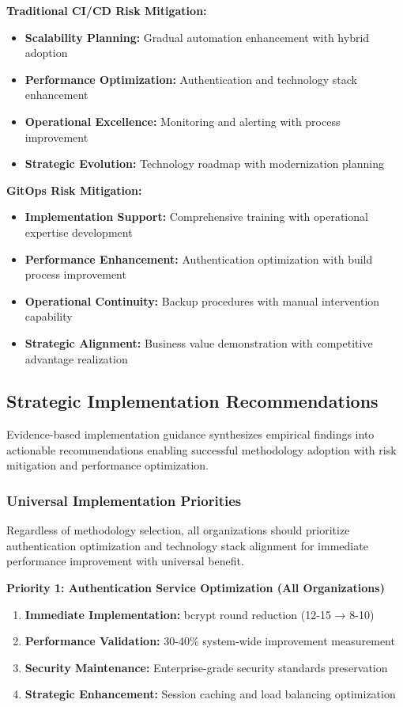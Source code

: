 \textbf{Traditional CI/CD Risk Mitigation:}
\begin{itemize}
\item \textbf{Scalability Planning:} Gradual automation enhancement with hybrid adoption
\item \textbf{Performance Optimization:} Authentication and technology stack enhancement
\item \textbf{Operational Excellence:} Monitoring and alerting with process improvement
\item \textbf{Strategic Evolution:} Technology roadmap with modernization planning
\end{itemize}

\textbf{GitOps Risk Mitigation:}
\begin{itemize}
\item \textbf{Implementation Support:} Comprehensive training with operational expertise development
\item \textbf{Performance Enhancement:} Authentication optimization with build process improvement
\item \textbf{Operational Continuity:} Backup procedures with manual intervention capability
\item \textbf{Strategic Alignment:} Business value demonstration with competitive advantage realization
\end{itemize}

\subsection{Strategic Implementation Recommendations}
\label{subsec:implementation_recommendations}

Evidence-based implementation guidance synthesizes empirical findings into actionable recommendations enabling successful methodology adoption with risk mitigation and performance optimization.

\subsubsection{Universal Implementation Priorities}

Regardless of methodology selection, all organizations should prioritize authentication optimization and technology stack alignment for immediate performance improvement with universal benefit.

\textbf{Priority 1: Authentication Service Optimization (All Organizations)}
\begin{enumerate}
\item \textbf{Immediate Implementation:} bcrypt round reduction (12-15 → 8-10)
\item \textbf{Performance Validation:} 30-40\% system-wide improvement measurement
\item \textbf{Security Maintenance:} Enterprise-grade security standards preservation
\item \textbf{Strategic Enhancement:} Session caching and load balancing optimization
\end{enumerate}

